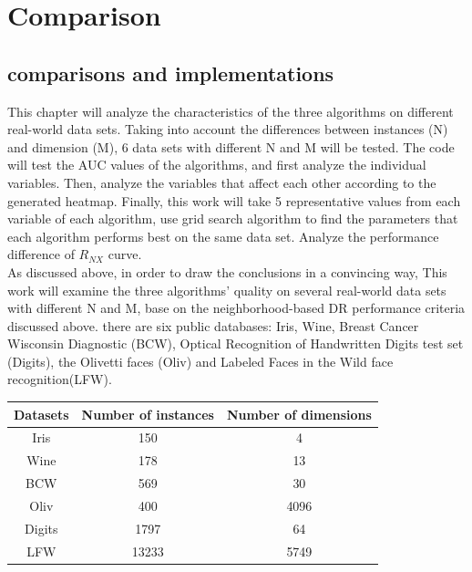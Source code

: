 \part{Comparison} \label{part:Comparison and implementation}

\chapter{comparisons and implementations}

This chapter will analyze the characteristics of the three algorithms on different real-world data sets. Taking into account the differences between instances (N) and dimension (M), 6 data sets with different N and M will be tested. The code will test the AUC values of the algorithms, and first analyze the individual variables. Then, analyze the variables that affect each other according to the generated heatmap. Finally, this work will take 5 representative values from each variable of each algorithm, use grid search algorithm to find the parameters that each algorithm performs best on the same data set. Analyze the performance difference of $R_{NX}$ curve.\\

\noindent As discussed above, in order to draw the conclusions in a convincing way, This work will examine the three algorithms' quality on several real-world data sets with different N and M, base on the neighborhood-based DR performance criteria discussed above. there are six public databases: Iris, Wine, Breast Cancer Wisconsin Diagnostic (BCW), Optical Recognition of Handwritten Digits test set (Digits), the Olivetti faces (Oliv) and Labeled Faces in the Wild face recognition(LFW).\\

\begin{center}
\begin{tabular}{|c|c|c|}%
\hline  %
Datasets & Number of instances & Number of dimensions\\
\hline  %
Iris & 150 & 4\\
\hline  %
Wine & 178 & 13\\
\hline  %
BCW & 569 & 30\\
\hline  %
Oliv & 400 & 4096\\
\hline  %
Digits & 1797 & 64\\
\hline  %
LFW & 13233 & 5749\\
\hline %
\end{tabular}\\
\end{center}
\\


